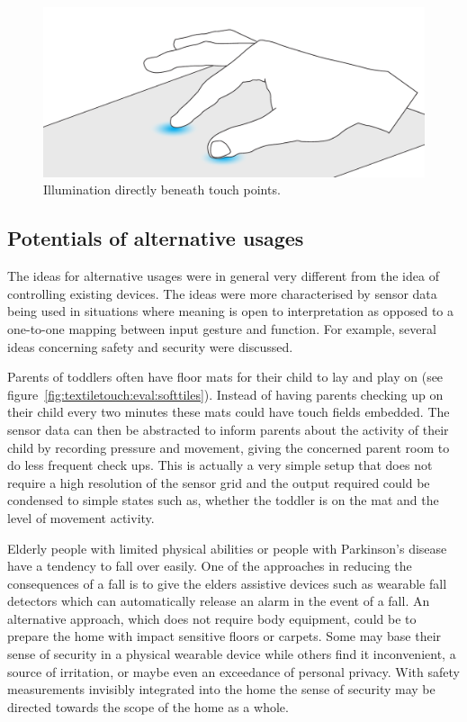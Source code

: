 \begin{figure}[h]
  \centering
  \begin{minipage}[b]{.8\textwidth}
    \centering
    \includegraphics[width=.7\linewidth]{figures/touch/evaluation/backlid_textile}
  \caption[Illumination directly beneath touch points.]
  {Illumination directly beneath touch points.}
  \label{fig:textiletouch:eval:backlighting}
  \end{minipage}
\end{figure}

\subsection{Potentials of alternative usages}

The ideas for alternative usages were in general very different from the idea of controlling existing devices.
The ideas were more characterised by sensor data being used in situations where meaning is open to interpretation as opposed to a one-to-one mapping between input gesture and function.
For example, several ideas concerning safety and security were discussed.

Parents of toddlers often have floor mats for their child to lay and play on (see figure~\ref{fig:textiletouch:eval:softtiles}).
Instead of having parents checking up on their child every two minutes these mats could have touch fields embedded.
The sensor data can then be abstracted to inform parents about the activity of their child by recording pressure and movement, giving the concerned parent room to do less frequent check ups.
This is actually a very simple setup that does not require a high resolution of the sensor grid and the output required could be condensed to simple states such as, whether the toddler is on the mat and the level of movement activity.

Elderly people with limited physical abilities or people with Parkinson's disease have a tendency to fall over easily.
One of the approaches in reducing the consequences of a fall is to give the elders assistive devices such as wearable fall detectors which can automatically release an alarm in the event of a fall.
An alternative approach, which does not require body equipment, could be to prepare the home with impact sensitive floors or carpets.
Some may base their sense of security in a physical wearable device while others find it inconvenient, a source of irritation, or maybe even an exceedance of personal privacy. 
With safety measurements invisibly integrated into the home the sense of security may be directed towards the scope of the home as a whole.

